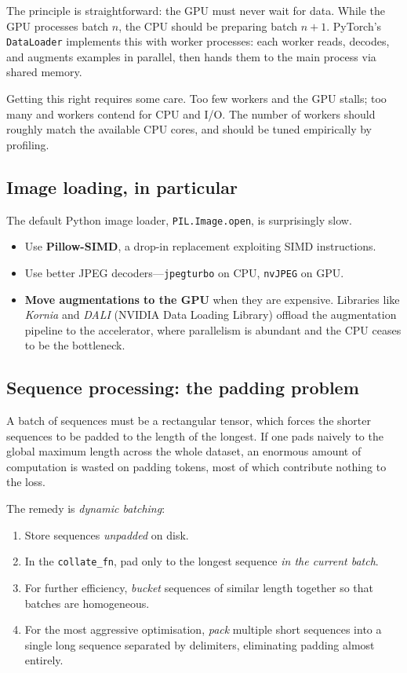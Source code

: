 \documentclass[11pt,a4paper]{article}
\theoremstyle{definition}
\theoremstyle{remark}
\theoremstyle{plain}
\begin{document}
The principle is straightforward: the GPU must never wait for data. While
the GPU processes batch $n$, the CPU should be preparing batch $n+1$.
PyTorch's \texttt{DataLoader} implements this with worker processes: each
worker reads, decodes, and augments examples in parallel, then hands them
to the main process via shared memory.

Getting this right requires some care. Too few workers and the GPU
stalls; too many and workers contend for CPU and I/O. The number of
workers should roughly match the available CPU cores, and should be tuned
empirically by profiling.

\subsection{Image loading, in particular}

The default Python image loader, \texttt{PIL.Image.open}, is surprisingly
slow.
\begin{itemize}[leftmargin=1.5em, itemsep=2pt]
    \item Use \textbf{Pillow-SIMD}, a drop-in replacement exploiting SIMD
          instructions.
    \item Use better JPEG decoders---\texttt{jpegturbo} on CPU,
          \texttt{nvJPEG} on GPU.
    \item \textbf{Move augmentations to the GPU} when they are expensive.
          Libraries like \emph{Kornia} and \emph{DALI} (NVIDIA Data
          Loading Library) offload the augmentation pipeline to the
          accelerator, where parallelism is abundant and the CPU ceases
          to be the bottleneck.
\end{itemize}

\subsection{Sequence processing: the padding problem}

A batch of sequences must be a rectangular tensor, which forces the
shorter sequences to be padded to the length of the longest. If one pads
naively to the global maximum length across the whole dataset, an
enormous amount of computation is wasted on padding tokens, most of which
contribute nothing to the loss.

The remedy is \emph{dynamic batching}:
\begin{enumerate}[leftmargin=1.8em, itemsep=2pt]
    \item Store sequences \emph{unpadded} on disk.
    \item In the \texttt{collate\_fn}, pad only to the longest sequence
          \emph{in the current batch}.
    \item For further efficiency, \emph{bucket} sequences of similar
          length together so that batches are homogeneous.
    \item For the most aggressive optimisation, \emph{pack} multiple
          short sequences into a single long sequence separated by
          delimiters, eliminating padding almost entirely.
\end{enumerate}
\end{document}
